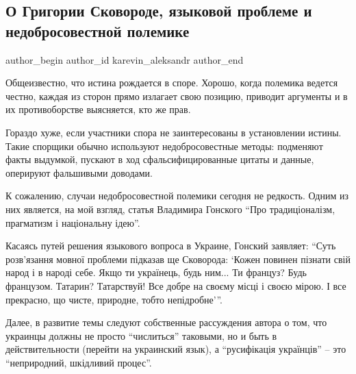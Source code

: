  
 
 
 
 
 
\subsection{О Григории Сковороде, языковой проблеме и недобросовестной полемике}
\label{sec:04_11_2008.news.ua.pravda.karevin_aleksandr.1.skovoroda_rus}
\ifcmt
	author_begin
   author_id karevin_aleksandr
	author_end
\fi

Общеизвестно, что истина рождается в споре. Хорошо, когда полемика ведется
честно, каждая из сторон прямо излагает свою позицию, приводит аргументы и в их
противоборстве выясняется, кто же прав.

Гораздо хуже, если участники спора не заинтересованы в установлении истины.
Такие спорщики обычно используют недобросовестные методы: подменяют факты
выдумкой, пускают в ход сфальсифицированные цитаты и данные, оперируют
фальшивыми доводами.

К сожалению, случаи недобросовестной полемики сегодня не редкость. Одним из них
является, на мой взгляд, статья Владимира Гонского \enquote{Про традиціоналізм,
прагматизм і національну ідею}.

Касаясь путей решения языкового вопроса в Украине, Гонский заявляет: \enquote{Суть
розв’язання мовної проблеми підказав ще Сковорода: \enquote{Кожен повинен пізнати свій
народ і в народі себе. Якщо ти українець, будь ним... Ти француз? Будь
французом. Татарин? Татарствуй! Все добре на своєму місці і своєю мірою. І все
прекрасно, що чисте, природне, тобто непідробне}}.

Далее, в развитие темы следуют собственные рассуждения автора о том, что
украинцы должны не просто \enquote{числиться} таковыми, но и быть в действительности
(перейти на украинский язык), а \enquote{русифікація українців} – это \enquote{неприродний,
шкідливий процес}.

